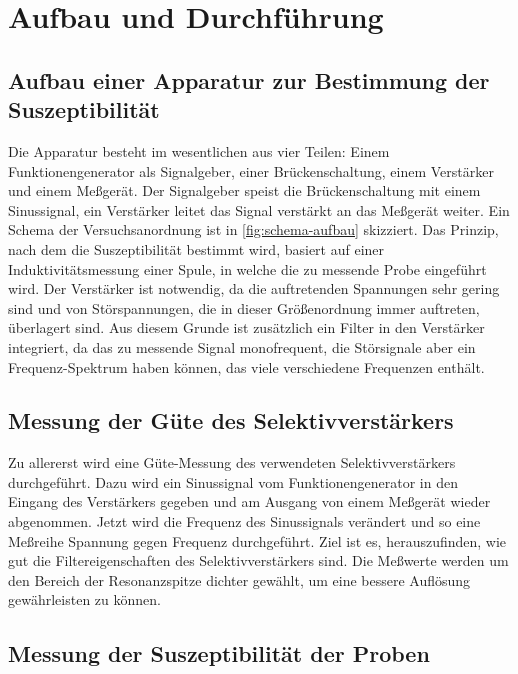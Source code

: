 
\section{Aufbau und Durchführung}

\subsection{Aufbau einer Apparatur zur Bestimmung der Suszeptibilität}
\label{sec:aufbau-apparatur}

Die Apparatur besteht im wesentlichen aus vier Teilen: Einem
Funktionengenerator als Signalgeber, einer Brückenschaltung, einem
Verstärker und einem Meßgerät. Der Signalgeber speist die
Brückenschaltung mit einem Sinussignal, ein Verstärker leitet das Signal
verstärkt an das Meßgerät weiter. Ein Schema der Versuchsanordnung ist
in \cref{fig:schema-aufbau} skizziert. Das Prinzip, nach dem die
Suszeptibilität bestimmt wird, basiert auf einer Induktivitätsmessung
einer Spule, in welche die zu messende Probe eingeführt wird. Der
Verstärker ist notwendig, da die auftretenden Spannungen sehr gering
sind und von Störspannungen, die in dieser Größenordnung immer
auftreten, überlagert sind. Aus diesem Grunde ist zusätzlich ein Filter
in den Verstärker integriert, da das zu messende Signal monofrequent,
die Störsignale aber ein Frequenz-Spektrum haben können, das viele
verschiedene Frequenzen enthält.

\subsection{Messung der Güte des Selektivverstärkers}

Zu allererst wird eine Güte-Messung des verwendeten Selektivverstärkers
durchgeführt. Dazu wird ein Sinussignal vom Funktionengenerator in den
Eingang des Verstärkers gegeben und am Ausgang von einem Meßgerät wieder
abgenommen. Jetzt wird die Frequenz des Sinussignals verändert und so
eine Meßreihe Spannung gegen Frequenz durchgeführt. Ziel ist es,
herauszufinden, wie gut die Filtereigenschaften des Selektivverstärkers
sind. Die Meßwerte werden um den Bereich der Resonanzspitze dichter
gewählt, um eine bessere Auflösung gewährleisten zu können.

\subsection{Messung der Suszeptibilität der Proben}

